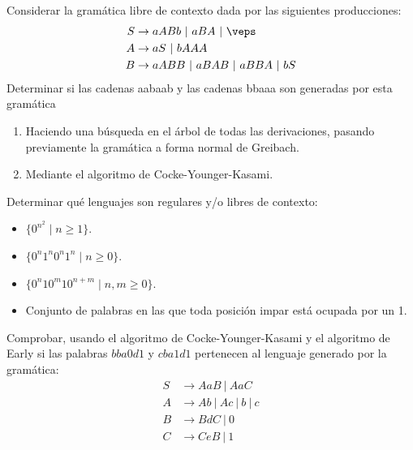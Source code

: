 \begin{ejercicio}\label{ej:1.6.5}
    Considerar la gramática libre de contexto dada por las siguientes producciones:
    \begin{align*}
        S &\rightarrow aABb\ |\ aBA\ |\ \veps \\
        A &\rightarrow aS\ |\ bAAA \\
        B &\rightarrow aABB\ |\ aBAB\ |\ aBBA\ |\ bS
    \end{align*}
    Determinar si las cadenas aabaab y las cadenas bbaaa son generadas por esta gramática
    \begin{enumerate}
        \item Haciendo una búsqueda en el árbol de todas las derivaciones, pasando previamente la gramática a forma normal de Greibach.
        \item Mediante el algoritmo de Cocke-Younger-Kasami.
    \end{enumerate}
\end{ejercicio}

\begin{ejercicio}\label{ej:1.6.6}
    Determinar qué lenguajes son regulares y/o libres de contexto:
    \begin{itemize}
        \item $\{0^{n^2}\mid n\geq 1\}$.
        \item $\{0^n 1^n 0^n 1^n \mid n \geq 0\}$.
        \item $\{0^n 10^m 10^{n+m}\mid n,m\geq 0\}$.
        \item Conjunto de palabras en las que toda posición impar está ocupada por un 1.
    \end{itemize}
\end{ejercicio}

\begin{ejercicio}\label{ej:1.6.7}
    Comprobar, usando el algoritmo de Cocke-Younger-Kasami y el algoritmo de Early si las palabras $bba0d1$ y $cba1d1$ pertenecen al lenguaje generado por la gramática:
    \begin{align*}
        S &\rightarrow AaB\ |\ AaC \\
        A &\rightarrow Ab\ |\ Ac\ |\ b\ |\ c \\
        B &\rightarrow BdC\ |\ 0 \\
        C &\rightarrow CeB\ |\ 1
    \end{align*}
\end{ejercicio}

